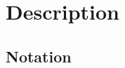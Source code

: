 \documentclass{article} %
\begin{document}







\section{Description}

\subsection{Notation}
\end{document}
